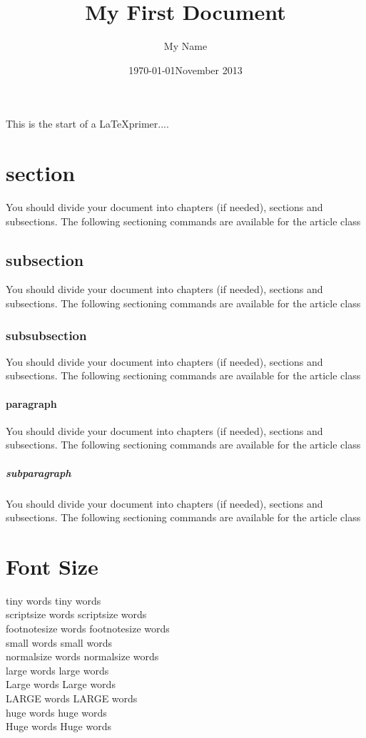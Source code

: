\documentclass{article}
\begin{document}
\title{My First Document}
\author{My Name}
\date{\today}
\date{November 2013}
\maketitle

\tableofcontents
\listoffigures
\listoftables
\newpage
{}


This is the start of a \LaTeX primer....
\section{section}
You should divide your document into chapters (if needed), sections and subsections. The following sectioning commands are available for the article
class
\subsection{subsection}
You should divide your document into chapters (if needed), sections and subsections. The following sectioning commands are available for the article
class
\subsubsection{subsubsection}
You should divide your document into chapters (if needed), sections and subsections. The following sectioning commands are available for the article
class
\paragraph{paragraph}
You should divide your document into chapters (if needed), sections and subsections. The following sectioning commands are available for the article
class
\subparagraph{subparagraph}
You should divide your document into chapters (if needed), sections and subsections. The following sectioning commands are available for the article class



{\section{Font Size}}
\noindent
{\tiny tiny words} tiny words\\
{\scriptsize scriptsize words} scriptsize words\\
{\footnotesize footnotesize words} footnotesize words\\
{\small small words} small words\\
{\normalsize normalsize words} normalsize words\\
{\large large words} large words\\
{\Large Large words} Large words\\
{\LARGE LARGE words} LARGE words\\
{\huge huge words} huge words\\
{\Huge Huge words} Huge words\\
\end{document}
